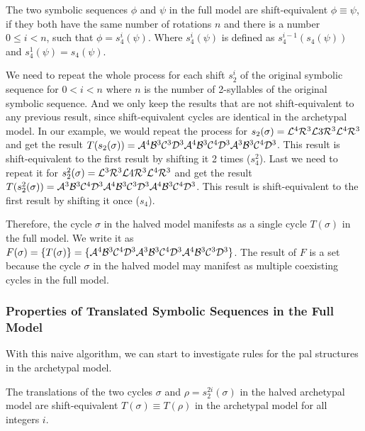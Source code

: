 \begin{definition}
	The two symbolic sequences $\phi$ and $\psi$ in the full model are shift-equivalent $\phi \equiv \psi$,
	if they both have the same number of rotations $n$
	and there is a number $0 \leq i < n$, such that $\phi = s_4^i(\psi)$.
	Where $s_4^i(\psi)$ is defined as $s_4^{i-1}(s_4(\psi))$ and $s_4^1(\psi) = s_4(\psi)$.
\end{definition}

We need to repeat the whole process for each shift $s_2^i$ of the original symbolic sequence for $0 < i < n$ where $n$ is the number of 2-syllables of the original symbolic sequence.
And we only keep the results that are not shift-equivalent to any previous result, since shift-equivalent cycles are identical in the archetypal model.
In our example, we would repeat the process for $s_2(\sigma) = \mathcal{L}^4\mathcal{R}^3\mathcal{L}3\mathcal{R}^3\mathcal{L}^4\mathcal{R}^3$ and get the result $T(s_2(\sigma)) = \mathcal{A}^4\mathcal{B}^3\mathcal{C}^3\mathcal{D}^3\mathcal{A}^4\mathcal{B}^3\mathcal{C}^4\mathcal{D}^3\mathcal{A}^3\mathcal{B}^3\mathcal{C}^4\mathcal{D}^3$.
This result is shift-equivalent to the first result by shifting it 2 times ($s_4^2$).
Last we need to repeat it for $s_2^2(\sigma) = \mathcal{L}^3\mathcal{R}^3\mathcal{L}4\mathcal{R}^3\mathcal{L}^4\mathcal{R}^3$ and get the result $T(s_2^2(\sigma)) = \mathcal{A}^3\mathcal{B}^3\mathcal{C}^4\mathcal{D}^3\mathcal{A}^4\mathcal{B}^3\mathcal{C}^3\mathcal{D}^3\mathcal{A}^4\mathcal{B}^3\mathcal{C}^4\mathcal{D}^3$.
This result is shift-equivalent to the first result by shifting it once ($s_4$).

Therefore, the cycle $\sigma$ in the halved model manifests as a single cycle $T(\sigma)$ in the full model.
We write it as $F(\sigma) = \{T(\sigma)\} = \{\mathcal{A}^4\mathcal{B}^3\mathcal{C}^4\mathcal{D}^3\mathcal{A}^3\mathcal{B}^3\mathcal{C}^4\mathcal{D}^3\mathcal{A}^4\mathcal{B}^3\mathcal{C}^3\mathcal{D}^3\}$.
The result of $F$ is a set because the cycle $\sigma$ in the halved model may manifest as multiple coexisting cycles in the full model.

\subsubsection{Properties of Translated Symbolic Sequences in the Full Model}

With this naive algorithm, we can start to investigate rules for the \gls{pal} structures in the archetypal model.

\begin{lemma}
	\label{lemma:equivalence.translations}
	The translations of the two cycles $\sigma$ and $\rho = s_2^{2i}(\sigma)$ in the halved archetypal model are shift-equivalent $T(\sigma) \equiv T(\rho)$ in the archetypal model for all integers $i$.
\end{lemma}

